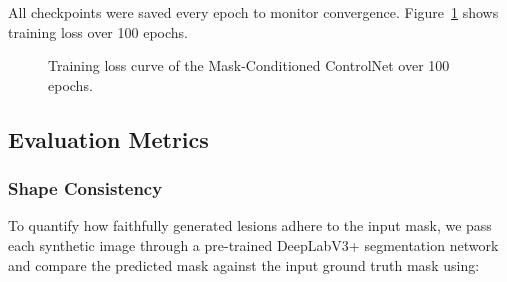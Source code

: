 \begin{table}[htbp]
    \centering
    \caption{Detailed Parameter Configuration}
    \label{tab:parameter_config}
\end{table}

All checkpoints were saved every epoch to monitor convergence. Figure~\ref{fig:loss_curve} shows training loss over 100 epochs.

\begin{figure}[H]
    \centering
    \caption{Training loss curve of the Mask-Conditioned ControlNet over 100 epochs.}
    \label{fig:loss_curve}
\end{figure}

\subsection{Evaluation Metrics}

\subsubsection{Shape Consistency}
To quantify how faithfully generated lesions adhere to the input mask, we pass each synthetic image through a pre-trained DeepLabV3+ segmentation network and compare the predicted mask against the input ground truth mask using:

